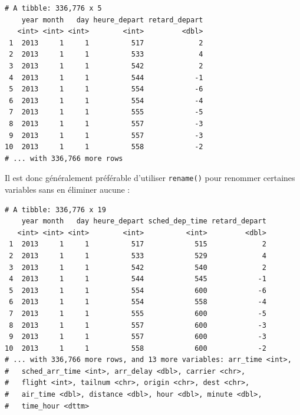 \documentclass[
  a4paper,
]{article}
\newenvironment{Shaded}{\begin{snugshade}}{\end{snugshade}}
\newcommand{\DataTypeTok}[1]{\textcolor[rgb]{0.00,0.34,0.68}{#1}}
\newcommand{\KeywordTok}[1]{\textcolor[rgb]{0.12,0.11,0.11}{\textbf{#1}}}
\newcommand{\NormalTok}[1]{\textcolor[rgb]{0.12,0.11,0.11}{#1}}
\newcommand{\OperatorTok}[1]{\textcolor[rgb]{0.12,0.11,0.11}{#1}}
\newcommand{\StringTok}[1]{\textcolor[rgb]{0.75,0.01,0.01}{#1}}
\begin{document}
\begin{Shaded}
\end{Shaded}

\begin{verbatim}
# A tibble: 336,776 x 5
    year month   day heure_depart retard_depart
   <int> <int> <int>        <int>         <dbl>
 1  2013     1     1          517             2
 2  2013     1     1          533             4
 3  2013     1     1          542             2
 4  2013     1     1          544            -1
 5  2013     1     1          554            -6
 6  2013     1     1          554            -4
 7  2013     1     1          555            -5
 8  2013     1     1          557            -3
 9  2013     1     1          557            -3
10  2013     1     1          558            -2
# ... with 336,766 more rows
\end{verbatim}

Il est donc généralement préférable d'utiliser \texttt{rename()} pour renommer certaines variables sans en éliminer aucune :

\begin{Shaded}
\end{Shaded}

\begin{verbatim}
# A tibble: 336,776 x 19
    year month   day heure_depart sched_dep_time retard_depart
   <int> <int> <int>        <int>          <int>         <dbl>
 1  2013     1     1          517            515             2
 2  2013     1     1          533            529             4
 3  2013     1     1          542            540             2
 4  2013     1     1          544            545            -1
 5  2013     1     1          554            600            -6
 6  2013     1     1          554            558            -4
 7  2013     1     1          555            600            -5
 8  2013     1     1          557            600            -3
 9  2013     1     1          557            600            -3
10  2013     1     1          558            600            -2
# ... with 336,766 more rows, and 13 more variables: arr_time <int>,
#   sched_arr_time <int>, arr_delay <dbl>, carrier <chr>,
#   flight <int>, tailnum <chr>, origin <chr>, dest <chr>,
#   air_time <dbl>, distance <dbl>, hour <dbl>, minute <dbl>,
#   time_hour <dttm>
\end{verbatim}
\end{document}

